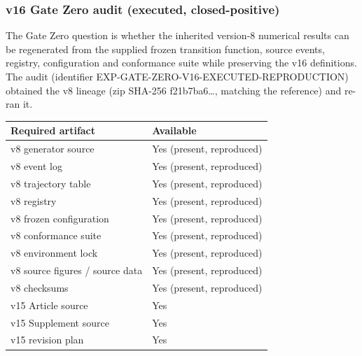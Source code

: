 \hypertarget{v16-gate-zero-audit-executed-closed-positive}{%
\subsubsection{v16 Gate Zero audit (executed,
closed-positive)}\label{v16-gate-zero-audit-executed-closed-positive}}

The Gate Zero question is whether the inherited version-8 numerical
results can be regenerated from the supplied frozen transition function,
source events, registry, configuration and conformance suite while
preserving the v16 definitions. The audit (identifier
EXP-GATE-ZERO-V16-EXECUTED-REPRODUCTION) obtained the v8 lineage (zip
SHA-256 f21b7ba6\ldots, matching the reference) and re-ran it.

\begin{longtable}[]{@{}ll@{}}
\toprule\noalign{}
Required artifact & Available \\
\midrule\noalign{}
\endhead
\bottomrule\noalign{}
\endlastfoot
v8 generator source & Yes (present, reproduced) \\
v8 event log & Yes (present, reproduced) \\
v8 trajectory table & Yes (present, reproduced) \\
v8 registry & Yes (present, reproduced) \\
v8 frozen configuration & Yes (present, reproduced) \\
v8 conformance suite & Yes (present, reproduced) \\
v8 environment lock & Yes (present, reproduced) \\
v8 source figures / source data & Yes (present, reproduced) \\
v8 checksums & Yes (present, reproduced) \\
v15 Article source & Yes \\
v15 Supplement source & Yes \\
v15 revision plan & Yes \\
\end{longtable}


